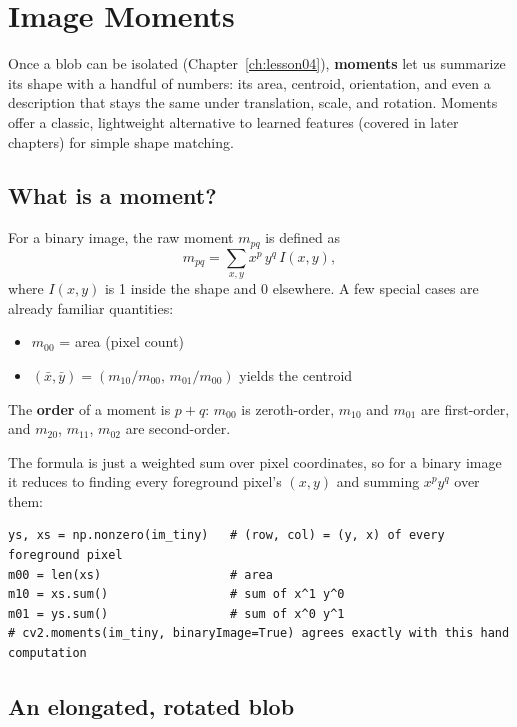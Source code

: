 \chapter{Image Moments}
\label{ch:lesson05}

Once a blob can be isolated (Chapter~\ref{ch:lesson04}), \textbf{moments} let us summarize its shape with a handful of numbers: its area, centroid, orientation, and even a description that stays the same under translation, scale, and rotation. Moments offer a classic, lightweight alternative to learned features (covered in later chapters) for simple shape matching.

\section{What is a moment?}

For a binary image, the raw moment $m_{pq}$ is defined as
\begin{equation}
m_{pq} = \sum_{x,y} x^p\, y^q\, I(x,y),
\end{equation}
where $I(x,y)$ is 1 inside the shape and 0 elsewhere. A few special cases are already familiar quantities:
\begin{itemize}
  \item $m_{00}$ = area (pixel count)
  \item $(\bar x, \bar y) = (m_{10}/m_{00},\, m_{01}/m_{00})$ yields the centroid
\end{itemize}
The \textbf{order} of a moment is $p+q$: $m_{00}$ is zeroth-order, $m_{10}$ and $m_{01}$ are first-order, and $m_{20}$, $m_{11}$, $m_{02}$ are second-order.

The formula is just a weighted sum over pixel coordinates, so for a binary image it reduces to finding every foreground pixel's $(x, y)$ and summing $x^py^q$ over them:

\begin{lstlisting}
ys, xs = np.nonzero(im_tiny)   # (row, col) = (y, x) of every foreground pixel
m00 = len(xs)                  # area
m10 = xs.sum()                 # sum of x^1 y^0
m01 = ys.sum()                 # sum of x^0 y^1
# cv2.moments(im_tiny, binaryImage=True) agrees exactly with this hand computation
\end{lstlisting}

\section{An elongated, rotated blob}

